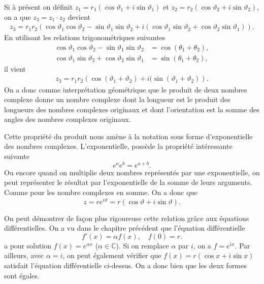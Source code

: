 \documentclass[a4paper,12pt]{book}
\newcommand{\complex}{\mathbb{C}}
\begin{document}
Si à présent on définit $z_1=r_1(\cos\vartheta_1+i\sin\vartheta_1)$ et $z_2=r_2(\cos\vartheta_2+i\sin\vartheta_2)$, on a que $z_3=z_1\cdot z_2$
devient
\begin{align}
 z_3=r_1r_2\left(\cos\vartheta_1\cos\vartheta_2-\sin\vartheta_1\sin\vartheta_2+i\left(\cos\vartheta_1\sin\vartheta_2+\cos\vartheta_2\sin\vartheta_1\right)\right).
\end{align}
En utilisant les relations trigonométriques suivantes
\begin{align}
 \cos\vartheta_1\cos\vartheta_2-\sin\vartheta_1\sin\vartheta_2&=\cos(\theta_1+\theta_2),\\
 \cos\vartheta_1\sin\vartheta_2+\cos\vartheta_2\sin\vartheta_1&=\sin(\theta_1+\theta_2),
\end{align}
il vient
\begin{align}
 z_3=r_1r_2\left(\cos(\vartheta_1+\vartheta_2)+i(\sin(\vartheta_1+\vartheta_2)\right).
\end{align}
On a donc comme interprétation géométrique que le produit de deux nombres complexe donne un nombre complexe dont 
la longueur est le produit des longueurs des nombres complexes originaux et dont l'orientation est la somme des angles des nombres complexes
originaux.

Cette propriété du produit nous amène à la notation sous forme d'exponentielle des nombres complexes.
L'exponentielle, possède la propriété intéressante suivante
\begin{equation}
 e^a e^b=e^{a+b}.
\end{equation}
Ou encore quand on multiplie deux nombres représentés par une exponentielle, on peut représenter
le résultat par l'exponentielle de la somme de leurs arguments. Comme pour les nombre complexes 
en somme. On a donc que
\begin{equation}
 z=re^{i\vartheta}=r(\cos\vartheta+i\sin\vartheta).
\end{equation}

On peut démontrer de façon plus rigoureuse cette relation grâce aux équations différentielles.
On a vu dans le chapitre précédent que l'équation différentielle
\begin{equation}
 f'(x)=\alpha f(x),\quad f(0)=r.
\end{equation}
a pour solution $f(x)=e^{\alpha x}$ ($\alpha\in\complex$). Si on remplace $\alpha$ par $i$, on a
$f=e^{ix}$. Par ailleurs, avec $\alpha=i$, on peut également vérifier que $f(x)=r(\cos x+i\sin x)$ 
satisfait l'équation différentielle ci-dessus. On a donc bien que les deux formes sont 
égales.
\end{document}
